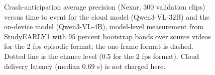 \documentclass[sigconf]{acmart}
\begin{document}
{\selectfont
\begin{figure}[t]
  \centering
  
  \caption{Crash-anticipation average precision (Nexar, 300 validation clips) versus time to event for the cloud model (Qwen3-VL-32B) and the on-device model (Qwen3-VL-4B), model-level measurement from StudyEARLY1 with 95 percent bootstrap bands over source videos for the 2 fps episodic format; the one-frame format is dashed. Dotted line is the chance level (0.5 for the 2 fps format). Cloud delivery latency (median 0.69 s) is not charged here.}
  \label{fig:F15_ap_vs_time_to_event}
\end{figure}
}


\end{document}
